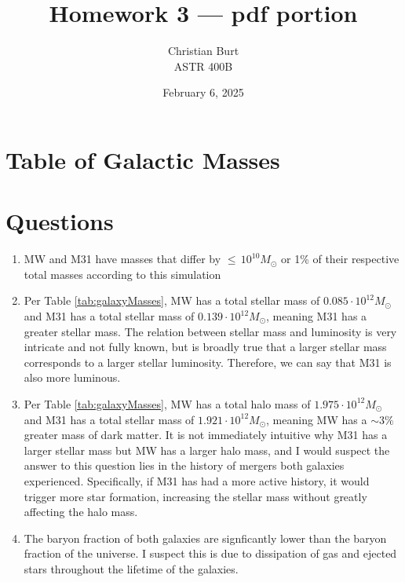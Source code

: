 \documentclass{article}
\title{Homework 3 — pdf portion}
\author{Christian Burt\\ASTR 400B}
\date{February 6, 2025}
\begin{document}
\maketitle
\setcounter{section}{2} %
    
    \section{Table of Galactic Masses}
    
    
    
    \section{Questions}

    \begin{enumerate}
        \item MW and M31 have masses that differ by $\le \, 10^{10} M_\odot$
          or 1\% of their respective total masses according to this simulation
          
        \item Per Table \ref{tab:galaxyMasses}, MW has a total stellar mass of
          $0.085 \cdot 10^{12} M_\odot$ and M31 has a total stellar mass of
          $0.139 \cdot 10^{12} M_\odot$, meaning M31 has a greater stellar
          mass. The relation between stellar mass and luminosity is very
          intricate and not fully known, but is broadly true that a larger
          stellar mass corresponds to a larger stellar luminosity. Therefore,
          we can say that M31 is also more luminous.

        \item Per Table \ref{tab:galaxyMasses}, MW has a total halo mass of
          $1.975 \cdot 10^{12} M_\odot$ and M31 has a total stellar mass of
          $1.921 \cdot 10^{12} M_\odot$, meaning MW has a $\sim3\%$ greater
          mass of dark matter. It is not immediately intuitive why M31 has
          a larger stellar mass but MW has a larger halo mass, and I would
          suspect the answer to this question lies in the history of
          mergers both galaxies experienced. Specifically, if M31 has had a
          more active history, it would trigger more star formation,
          increasing the stellar mass without greatly affecting the halo
          mass.

        \item The baryon fraction of both galaxies are signficantly lower than
          the baryon fraction of the universe. I suspect this is due to
          dissipation of gas and ejected stars throughout the lifetime of the
          galaxies.
    \end{enumerate}
    

% 
% 
\end{document}
